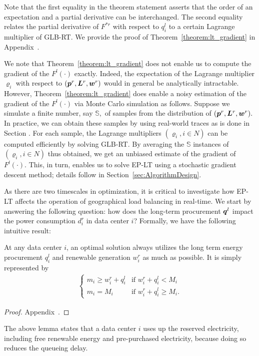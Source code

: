 Note that the first equality in the theorem statement asserts that the
order of an expectation and a partial derivative can be
interchanged. The second equality relates the partial derivative of
$F^{*r}$ with respect to $q^l_i$ to a certain Lagrange multiplier of
GLB-RT. We provide the proof of Theorem~\ref{theorem:lt_gradient} in
Appendix~.

We note that Theorem~\ref{theorem:lt_gradient} does not enable us to
compute the gradient of the $F^l(\cdot)$ exactly. Indeed, the
expectation of the Lagrange multiplier $\varrho_i$ with respect to
$(\boldsymbol{p}^r,\boldsymbol{L}^r,\boldsymbol{w}^r)$ would in general be
analytically intractable. However, Theorem~\ref{theorem:lt_gradient}
does enable a noisy estimation of the gradient of the $F^l(\cdot)$ via
Monte Carlo simulation as follows. Suppose we simulate a finite
number, say $\mathbb{S},$ of samples from the distribution of
$(\boldsymbol{p}^r,\boldsymbol{L}^r,\boldsymbol{w}^r).$ In practice, we can obtain
these samples by using real-world traces as is done in Section
\new{\ref{sec:caseStudy}}. For each sample, the Lagrange multipliers
$(\varrho_i, i \in N)$ can be computed efficiently by solving
GLB-RT. By averaging the $\mathbb{S}$ instances of $(\varrho_i, i \in
N)$ thus obtained, we get an unbiased estimate of the gradient of
$F^l(\cdot).$ This, in turn, enables us to solve EP-LT using a
stochastic gradient descent method; details follow in
Section~\ref{sec:AlgorithmDesign}.


As there are two timescales in optimization, it is critical to investigate how EP-LT affects the operation of geographical load balancing in real-time. We start by answering the following question: how does the long-term procurement $\boldsymbol{q}^l$ impact the power consumption $d^r_i$ in data center $i$? Formally, we have the following intuitive result:
\begin{lemma}    
	\label{theorem:RealTimeOptimalDemand}
	At any data center $i$, an optimal solution always utilizes the long term energy procurement $q^l_i$ and renewable generation $w^r_i$ as much as possible. It is simply represented by
	\begin{eqnarray}         
	\begin{cases} 
	m_i \geq w^r_i+q^l_i  &\mbox{if  } w^r_i + q^l_i < M_i \\ 
	m_i = M_i & \mbox{if  } w^r_i + q^l_i \geq M_i. 
	\end{cases}
	\end{eqnarray}
\end{lemma}
\begin{proof} Appendix~.
\end{proof}
The above lemma states that a data center $i$ uses up the reserved
electricity, including free renewable energy and pre-purchased
electricity, because doing so reduces the queueing delay.


